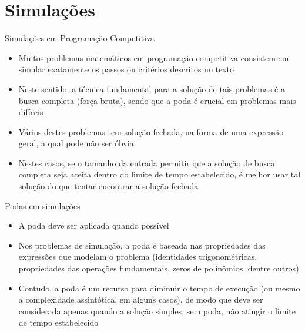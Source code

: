 \section*{Simulações}

\begin{frame}[fragile]{Simulações em Programação Competitiva}

    \begin{itemize}
        \item Muitos problemas matemáticos em programação competitiva consistem em simular exatamente os passos ou critérios descritos no texto

        \item Neste sentido, a técnica fundamental para a solução de tais problemas é a busca completa (força bruta), sendo que a poda é crucial em problemas mais difíceis

        \item Vários destes problemas tem solução fechada, na forma de uma expressão geral, a qual pode não ser óbvia

        \item Nestes casos, se o tamanho da entrada permitir que a solução de busca completa seja aceita dentro do limite de tempo estabelecido, é melhor usar tal solução do que tentar encontrar a solução fechada
    \end{itemize}

\end{frame}

\begin{frame}[fragile]{Podas em simulações}

    \begin{itemize}
        \item A poda deve ser aplicada quando possível

        \item Nos problemas de simulação, a poda é baseada nas propriedades das expressões que modelam o problema (identidades trigonométricas, propriedades das operações fundamentais, zeros de polinômios, dentre outros)

        \item Contudo, a poda é um recurso para diminuir o tempo de execução (ou mesmo a complexidade assintótica, em alguns casos), de modo que deve ser considerada apenas quando a solução simples, sem poda, não atingir o limite de tempo estabelecido
    \end{itemize}

\end{frame}

